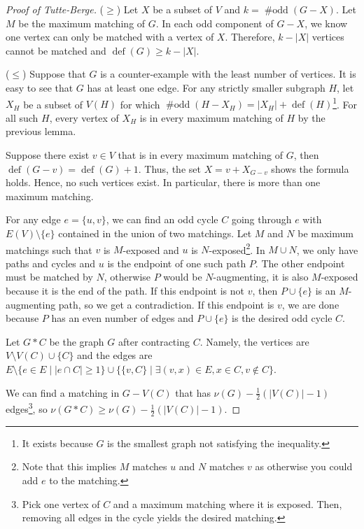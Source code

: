 \documentclass{tufte-handout}
\theoremstyle{definition}
\theoremstyle{remark}
\DeclareMathOperator{\odd}{\#odd}
\DeclareMathOperator{\defic}{def}
\begin{document}
\begin{proof}[Proof of Tutte-Berge]
	($\geq$) Let $X$ be a subset of $V$ and $k = \odd(G-X)$. Let $M$ be the maximum matching of $G$. In each odd component of $G-X$, we know one vertex can only be matched with a vertex of $X$. Therefore, $k- |X|$ vertices cannot be matched and $\defic(G) \geq k-|X|$.
	
	($\leq$) Suppose that $G$ is a counter-example with the least number of vertices. It is easy to see that $G$ has at least one edge. For any strictly smaller subgraph $H$, let $X_H$ be a subset of $V(H)$ for which $\odd(H-X_H) = |X_H| + \defic(H)$\footnote{It exists because $G$ is the smallest graph not satisfying the inequality.}. For all such $H$, every vertex of $X_H$ is in every maximum matching of $H$ by the previous lemma.
	
	Suppose there exist $v \in V$ that is in every maximum matching of $G$, then $\defic(G-v) = \defic(G)+1$. Thus, the set $X = v+ X_{G-v}$ shows the formula holds. Hence, no such vertices exist. In particular, there is more than one maximum matching.
	
	For any edge $e = \{u,v\}$, we can find an odd cycle $C$ going through $e$ with $E(V)\setminus \{e\}$ contained in the union of two matchings. Let $M$ and $N$ be maximum matchings such that $v$ is $M$-exposed and $u$ is $N$-exposed\footnote{Note that this implies $M$ matches $u$ and $N$ matches $v$ as otherwise you could add $e$ to the matching.}. In $M\cup N$, we only have paths and cycles and $u$ is the endpoint of one such path $P$. The other endpoint must be matched by $N$, otherwise $P$ would be $N$-augmenting, it is also $M$-exposed because it is the end of the path. If this endpoint is not $v$, then $P \cup \{e\}$ is an $M$-augmenting path, so we get a contradiction.
	If this endpoint is $v$, we are done because $P$ has an even number of edges and $P \cup \{e\}$ is the desired odd cycle $C$.
	
	Let $G*C$ be the graph $G$ after contracting $C$. Namely, the vertices are $V \setminus V(C) \cup\{C\}$ and the edges are $E \setminus \{e \in E \mid |e\cap C| \geq 1\} \cup \{\{v,C\} \mid \exists (v,x) \in E, x \in C, v\notin C\}$.
	
	We can find a matching in $G-V(C)$ that has $\nu(G) - \frac{1}{2}(|V(C)|-1)$ edges\footnote{Pick one vertex of $C$ and a maximum matching where it is exposed. Then, removing all edges in the cycle yields the desired matching.}, so $\nu(G*C) \geq \nu(G) - \frac{1}{2}(|V(C)|-1)$.
	

\end{proof}
\end{document}
